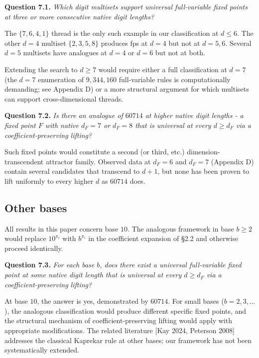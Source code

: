\documentclass[11pt,letterpaper]{article}
\theoremstyle{paperstyle}
\theoremstyle{paperstyledef}
\theoremstyle{paperstylerem}
\begin{document}
\textbf{Question 7.1.} \emph{Which digit multisets support universal
full-variable fixed points at three or more consecutive native digit
lengths?}

The \(\{7, 6, 4, 1\}\) thread is the only such example in our
classification at \(d \leq 6\). The other \(d = 4\) multiset
\(\{2, 3, 5, 8\}\) produces fps at \(d = 4\) but not at \(d = 5, 6\).
Several \(d = 5\) multisets have analogues at \(d = 4\) or \(d = 6\) but
not at both.

Extending the search to \(d \geq 7\) would require either a full
classification at \(d = 7\) (the \(d = 7\) enumeration of
\(9{,}344{,}160\) full-variable rules is computationally demanding; see
Appendix D) or a more structural argument for which multisets can
support cross-dimensional threads.

\textbf{Question 7.2.} \emph{Is there an analogue of \(60714\) at higher
native digit lengths - a fixed point \(F\) with native \(d_F = 7\) or
\(d_F = 8\) that is universal at every \(d \geq d_F\) via a
coefficient-preserving lifting?}

Such fixed points would constitute a second (or third, etc.)
dimension-transcendent attractor family. Observed data at \(d_F = 6\)
and \(d_F = 7\) (Appendix D) contain several candidates that transcend
to \(d + 1\), but none has been proven to lift uniformly to every higher
\(d\) as \(60714\) does.

\hypertarget{other-bases}{%
\subsection{Other bases}\label{other-bases}}

All results in this paper concern base \(10\). The analogous framework
in base \(b \geq 2\) would replace \(10^{\pi_i}\) with \(b^{\pi_i}\) in
the coefficient expansion of §2.2 and otherwise proceed identically.

\textbf{Question 7.3.} \emph{For each base \(b\), does there exist a
universal full-variable fixed point at some native digit length that is
universal at every \(d \geq d_F\) via a coefficient-preserving lifting?}

At base \(10\), the answer is yes, demonstrated by \(60714\). For small
bases (\(b = 2, 3, \ldots\)), the analogous classification would produce
different specific fixed points, and the structural mechanism of
coefficient-preserving lifting would apply with appropriate
modifications. The related literature {[}Kay 2024, Peterson 2008{]}
addresses the classical Kaprekar rule at other bases; our framework has
not been systematically extended.
\end{document}
